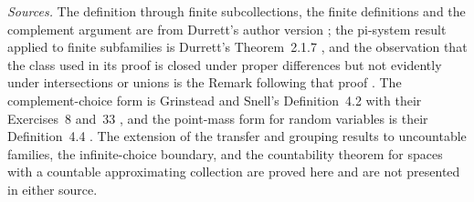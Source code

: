 \emph{Sources.} The definition through finite subcollections, the
finite definitions and the complement argument are from Durrett's
author version \cite[pp.~43--45, Theorems~2.1.1--2.1.3]{DurrettPTEAuthor2019};
the pi-system result applied to finite subfamilies is Durrett's
Theorem~2.1.7 \cite[p.~46]{DurrettPTEAuthor2019}, and the observation
that the class used in its proof is closed under proper differences but
not evidently under intersections or unions is the Remark following that
proof \cite[p.~47]{DurrettPTEAuthor2019}. The complement-choice
form is Grinstead and Snell's Definition~4.2 with their Exercises~8
and~33 \cite[sec.~4.1, pp.~141, 151, 155]{GrinsteadSnellChance2006},
and the point-mass form for random variables is their Definition~4.4
\cite[sec.~4.1, p.~143]{GrinsteadSnellChance2006}.
The extension of the transfer and grouping results to uncountable
families, the infinite-choice boundary, and the countability theorem
for spaces with a countable approximating collection are proved here
and are not presented in either source.
